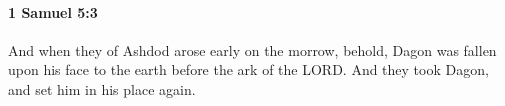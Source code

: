 
		\paragraph{1 Samuel 5:3} %
			\label{1SAMUEL-5-3}

			And when they of Ashdod arose early on the morrow, behold, Dagon was fallen upon his face to the earth before the ark of the LORD. And they took Dagon, and set him in his place again.


